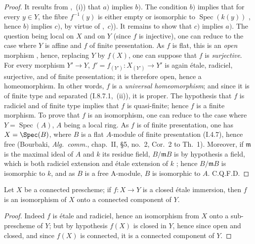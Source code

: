 \begin{proof}
It results from ,~(i)) that $a)$ implies $b)$.
The condition $b)$ implies that for every $y\in Y$, the fibre $f^{-1}(y)$ is either empty or isomorphic to $\operatorname{Spec}(k(y))$ , hence $b)$ implies $c)$, by virtue of ,~$c$)).
It remains to show that $c)$ implies $a)$.
The question being local on $X$ and on $Y$ (since $f$ is injective), one can reduce to the case where $Y$ is affine and $f$ of finite presentation.
As $f$ is flat, this is an \emph{open} morphism , hence, replacing $Y$ by $f(X)$, one can suppose that $f$ is \emph{surjective}.
For every morphism $Y'\to Y$, $f'=f_{(Y')}:X_{(Y')}\to Y'$ is again \'etale, radiciel, surjective, and of finite presentation; it is therefore open, hence a homeomorphism.
In other words, $f$ is a \emph{universal homeomorphism}; and since it is of finite type and separated (I.8.7.1,~(ii)), it is proper.
The hypothesis that $f$ is radiciel and of finite type implies that $f$ is quasi-finite; hence  $f$ is a finite morphism.
To prove that $f$ is an isomorphism, one can reduce to the case where $Y=\operatorname{Spec}(A)$, $A$ being a local ring.
As $f$ is of finite presentation, one has $X=\Spec(B)$, where $B$ is a flat $A$-module of finite presentation (I.4.7), hence free (Bourbaki, \emph{Alg.~comm.}, chap.~II, \S5, no.~2, Cor.~2 to Th.~1).
Moreover, if $\mathfrak{m}$ is the maximal ideal of $A$ and $k$ its residue field, $B/\mathfrak{m}B$ is by hypothesis a field, which is both radiciel extension and \'etale extension of $k$ ; hence $B/\mathfrak{m}B$ is isomorphic to $k$, and as $B$ is a free A-module, $B$ is isomorphic to $A$.
C.Q.F.D.
\end{proof}

\begin{corollary}[17.9.2]
\label{IV.17.9.2}
Let $X$ be a connected prescheme; if $f:X\to Y$ is a closed \'etale immersion, then $f$ is an isomorphism of $X$ onto a connected component of $Y$.
\end{corollary}

\begin{proof}
Indeed $f$ is \'etale and radiciel, hence an isomorphism from $X$ onto a sub-prescheme of $Y$; but by hypothesis $f(X)$ is closed in $Y$, hence since open and closed, and since $f(X)$ is connected, it is a connected component of $Y$.
\end{proof}


